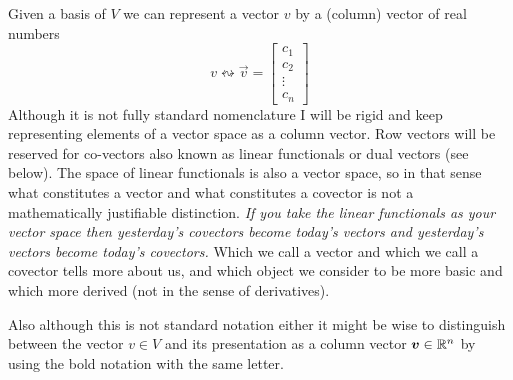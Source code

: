 \documentclass[12pt]{amsart}
\begin{document}
Given a basis of $V$ we can represent a vector $v$ by a (column) vector of real numbers
\begin{equation}\label{eq:ebasisrep}
	v \leftrightsquigarrow \vec{v} = \begin{bmatrix} c_1\\ c_2\\ \vdots \\ c_n \end{bmatrix}
\end{equation}
Although it is not fully standard nomenclature I will be rigid and keep representing elements of a vector space as a column vector. Row vectors will be reserved for co-vectors also known as linear functionals or dual vectors (see below). The space of linear functionals is also a vector space, so in that sense what constitutes a vector and what constitutes a covector is not a mathematically justifiable distinction. \emph{If you take the linear functionals as your vector space then yesterday's covectors become today's vectors and yesterday's vectors become today's covectors.} Which we call a vector and which we call a covector tells more about us, and which object we consider to be more basic and which more derived (not in the sense of derivatives). 

Also although this is not standard notation either it might be wise to distinguish between the vector $v\in V$ and its presentation as a column vector $\mathbf{\boldsymbol{v}} \in \mathbb{R}^n$ by using the bold notation with the same letter. 
\end{document}
